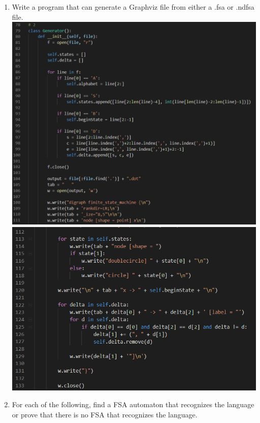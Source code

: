 \documentclass[a4paper]{article}
\begin{document}
\begin{enumerate}
    \newpage
    \item Write a program that can generate a Graphviz file from either a .fsa
    or .ndfsa file. \\

    \includegraphics[scale=0.65]{2a} \\ 
    \includegraphics[scale=0.65]{2b} 
    
    

    \addtocounter{enumi}{1}

    \newpage
    \item For each of the following, find a FSA automaton that recognizes the
    language or prove that there is no FSA that recognizes the language.
    

\end{enumerate}
\end{document}

